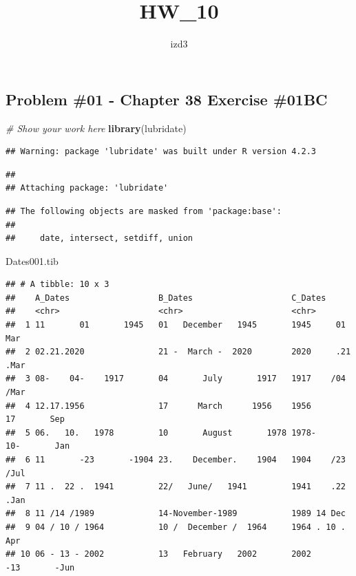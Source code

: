 \documentclass[
]{article}
\title{HW\_10}
\author{izd3}
\date{}
\newenvironment{Shaded}{\begin{snugshade}}{\end{snugshade}}
\newcommand{\CommentTok}[1]{\textcolor[rgb]{0.56,0.35,0.01}{\textit{#1}}}
\newcommand{\FunctionTok}[1]{\textcolor[rgb]{0.13,0.29,0.53}{\textbf{#1}}}
\newcommand{\NormalTok}[1]{#1}
\begin{document}
\maketitle

\newpage

\hypertarget{problem-01---chapter-38-exercise-01bc}{%
\subsection{Problem \#01 - Chapter 38 Exercise
\#01BC}\label{problem-01---chapter-38-exercise-01bc}}

\begin{Shaded}
\begin{Highlighting}[]
\CommentTok{\# Show your work here}
\FunctionTok{library}\NormalTok{(lubridate)}
\end{Highlighting}
\end{Shaded}

\begin{verbatim}
## Warning: package 'lubridate' was built under R version 4.2.3
\end{verbatim}

\begin{verbatim}
## 
## Attaching package: 'lubridate'
\end{verbatim}

\begin{verbatim}
## The following objects are masked from 'package:base':
## 
##     date, intersect, setdiff, union
\end{verbatim}

\begin{Shaded}
\begin{Highlighting}[]
\NormalTok{Dates001.tib}
\end{Highlighting}
\end{Shaded}

\begin{verbatim}
## # A tibble: 10 x 3
##    A_Dates                  B_Dates                    C_Dates                  
##    <chr>                    <chr>                      <chr>                    
##  1 11       01       1945   01   December   1945       1945     01     Mar      
##  2 02.21.2020               21 -  March -  2020        2020     .21     .Mar    
##  3 08-    04-    1917       04       July       1917   1917    /04    /Mar      
##  4 12.17.1956               17      March      1956    1956       17       Sep  
##  5 06.   10.   1978         10       August       1978 1978-       10-       Jan
##  6 11       -23       -1904 23.    December.    1904   1904    /23    /Jul      
##  7 11 .  22 .  1941         22/   June/   1941         1941    .22    .Jan      
##  8 11 /14 /1989             14-November-1989           1989 14 Dec              
##  9 04 / 10 / 1964           10 /  December /  1964     1964 . 10 . Apr          
## 10 06 - 13 - 2002           13   February   2002       2002       -13       -Jun
\end{verbatim}
\end{document}

